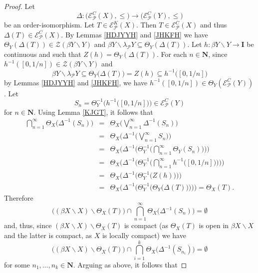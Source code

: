 \documentclass{amsart}
\theoremstyle{definition}
\theoremstyle{remark}
\theoremstyle{notation}
\numberwithin{equation}{section}
\begin{document}
\begin{proof}
Let
\[\Delta:\big({\mathscr E}^C_{{\mathcal P}}(X),\leq\big)\rightarrow\big({\mathscr E}^C_{{\mathcal P}}(Y),\leq\big)\]
be an  order-isomorphism. Let $T\in {\mathscr E}^K_{{\mathcal P}}(X)$. Then $T\in {\mathscr E}^C_{{\mathcal P}}(X)$
and thus $\Delta(T)\in {\mathscr E}^C_{{\mathcal P}}(X)$. By Lemmas \ref{HDJYYH} and \ref{JHKFH}  we have  $\Theta_Y(\Delta(T))\in {\mathscr Z}(\beta Y\backslash Y)$ and
$\beta Y\backslash\lambda_{{\mathcal P}} Y\subseteq \Theta_Y(\Delta(T))$.
Let $h:\beta Y\backslash Y\rightarrow\mathbf{I}$ be continuous and such that $Z(h)=\Theta_Y(\Delta(T))$. For each $n\in \mathbf{N}$, since
$h^{-1}([0,1/n])\in  {\mathscr Z}(\beta Y\backslash Y)$ and
\[\beta Y\backslash\lambda_{{\mathcal P}} Y\subseteq \Theta_Y\big(\Delta(T)\big)=Z(h)\subseteq h^{-1}\big([0,1/n]\big)\]
by Lemmas \ref{HDJYYH} and \ref{JHKFH}, we have   $h^{-1}([0,1/n])\in\Theta_Y({\mathscr E}^C_{{\mathcal P}}(Y))$. Let
\[S_n=\Theta_Y^{-1}\big( h^{-1}\big([0,1/n]\big)\big)\in {\mathscr E}^C_{{\mathcal P}}(Y)\]
for $n\in \mathbf{N}$. Using Lemma \ref{KJGT}, it follows that
\begin{eqnarray*}
\bigcap_{n=1}^\infty\Theta_X\big(\Delta^{-1}(S_n)\big)&=&\Theta_X\Big(\bigvee_{n=1}^\infty\Delta^{-1}(S_n)\Big)\\&=&
\Theta_X\Big(\Delta^{-1}\Big(\bigvee_{n=1}^\infty S_n\Big)\Big)\\&=&\Theta_X\Big(\Delta^{-1}\Big(\Theta_Y^{-1}\Big(\bigcap_{n=1}^\infty \Theta_Y(S_n)\Big)\Big)\Big)
\\&=&\Theta_X\Big(\Delta^{-1}\Big(\Theta_Y^{-1}\Big(\bigcap_{n=1}^\infty  h^{-1}\big([0,1/n]\big)\Big)\Big)\Big)
\\&=&\Theta_X\big(\Delta^{-1}\big(\Theta_Y^{-1}\big(Z(h)\big)\big)\big)
\\&=&\Theta_X\big(\Delta^{-1}\big(\Theta_Y^{-1}\big(\Theta_Y\big(\Delta(T)\big)\big)\big)\big)=\Theta_X(T).
\end{eqnarray*}
Therefore
\[\big((\beta X\backslash X)\backslash\Theta_X(T)\big)\cap\bigcap_{n=1}^\infty\Theta_X\big(\Delta^{-1}(S_n)\big)=\emptyset\]
and, thus, since $(\beta X\backslash X)\backslash\Theta_X(T)$ is compact (as $\Theta_X(T)$ is open in $\beta X\backslash X$ and the latter is compact, as $X$ is locally compact) we have
\begin{equation}\label{HGTTD}
\big((\beta X\backslash X)\backslash\Theta_X(T)\big)\cap\bigcap_{i=1}^k\Theta_X\big(\Delta^{-1}(S_{n_i})\big)=\emptyset
\end{equation}
for some $n_1,\ldots,n_k\in  \mathbf{N}$. Arguing as above, it follows that

\end{proof}
\end{document}
